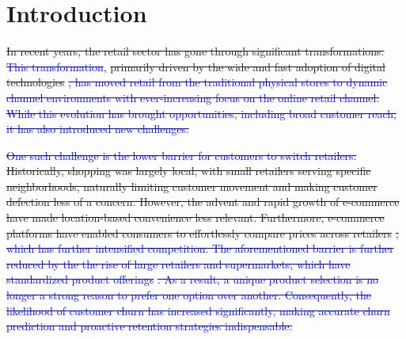 \section{Introduction}
\label{sec:introduction}



\sout{In recent years, the retail sector has gone through significant transformations.} \textcolor{blue}{\sout{This transformation}}, \sout{primarily driven by the wide and fast adoption of digital technologies} \cite{REINARTZ2019350}\textcolor{blue}{\sout{, has moved retail from the traditional physical stores to dynamic channel environments with ever-increasing focus on the online retail channel. While this evolution has brought opportunities, including broad customer reach, it has also introduced new challenges.}}

\textcolor{blue}{\sout{One such challenge is the lower barrier for customers to switch retailers.}} 
\sout{Historically, shopping was largely local, with small retailers serving specific neighborhoods, naturally limiting customer movement and making customer defection less of a concern. However, the advent and rapid growth of e-commerce have made location-based convenience less relevant. Furthermore, e-commerce platforms have enabled consumers to effortlessly compare prices across retailers} \cite{matuszelanski2022customer, Digitalization-of-retailing-Hagberg}\textcolor{blue}{\sout{, which has further intensified competition. The aforementioned barrier is further reduced by the the rise of large retailers and supermarkets, which have standardized product offerings}} \cite{basker2012supersize, Reinartz2003TheIO}\textcolor{blue}{\sout{. As a result, a unique product selection is no longer a strong reason to prefer one option over another. Consequently, the likelihood of customer churn has increased significantly, making accurate churn prediction and proactive retention strategies indispensable.}}

